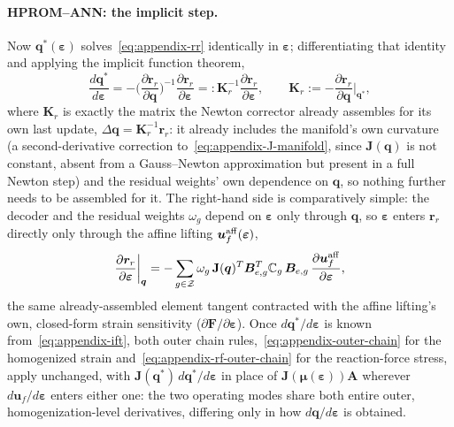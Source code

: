 \documentclass[10pt,a4paper]{article}
\begin{document}
\paragraph{HPROM--ANN: the implicit step.} Now $\bm q^*(\bm\varepsilon)$
solves~\eqref{eq:appendix-rr} identically in $\bm\varepsilon$;
differentiating that identity and applying the implicit function theorem,
\begin{equation}
 \frac{d\bm q^*}{d\bm\varepsilon}=-\Big(\frac{\partial\bm
 r_r}{\partial\bm q}\Big)^{-1}\frac{\partial\bm r_r}{\partial\bm\varepsilon}=:\mathbf
 K_r^{-1}\frac{\partial\bm r_r}{\partial\bm\varepsilon},\qquad \mathbf
 K_r:=-\frac{\partial\bm r_r}{\partial\bm q}\bigg|_{\bm q^*},
 \label{eq:appendix-ift}
\end{equation}
where $\mathbf K_r$ is exactly the matrix the Newton corrector already
assembles for its own last update, $\Delta\bm q=\mathbf K_r^{-1}\bm r_r$: it
already includes the manifold's own curvature (a second-derivative
correction to~\eqref{eq:appendix-J-manifold}, since $\mathbf J(\bm q)$ is
not constant, absent from a Gauss--Newton approximation but present in a
full Newton step) and the residual weights' own dependence on $\bm q$, so
nothing further needs to be assembled for it. The right-hand side is
comparatively simple: the decoder and the residual weights $\omega_g$
depend on $\bm\varepsilon$ only through $\bm q$, so $\bm\varepsilon$ enters
$\bm r_r$ directly only through the affine lifting $\bm
u_f^{\rm aff}(\bm\varepsilon)$,
\begin{equation}
 \frac{\partial\bm r_r}{\partial\bm\varepsilon}\bigg|_{\bm
 q}=-\sum_{g\in\mathcal Z}\omega_g\,\mathbf J(\bm q)^T\bm B_{e,g}^T\mathbb
 C_g\,\bm B_{e,g}\,\frac{\partial\bm u_f^{\rm aff}}{\partial\bm\varepsilon},
 \label{eq:appendix-drrde}
\end{equation}
the same already-assembled element tangent contracted with the affine
lifting's own, closed-form strain sensitivity ($\partial\bm
F/\partial\bm\varepsilon$). Once $d\bm q^*/d\bm\varepsilon$ is known
from~\eqref{eq:appendix-ift}, both outer chain
rules,~\eqref{eq:appendix-outer-chain} for the homogenized strain
and~\eqref{eq:appendix-rf-outer-chain} for the reaction-force stress,
apply unchanged, with $\mathbf
J(\bm q^*)\,d\bm q^*/d\bm\varepsilon$ in place of $\mathbf
J(\bm\mu(\bm\varepsilon))\mathbf A$ wherever $d\bm u_f/d\bm\varepsilon$
enters either one: the two operating modes share both entire outer,
homogenization-level derivatives, differing only in how $d\bm
q/d\bm\varepsilon$ is obtained.
\end{document}
